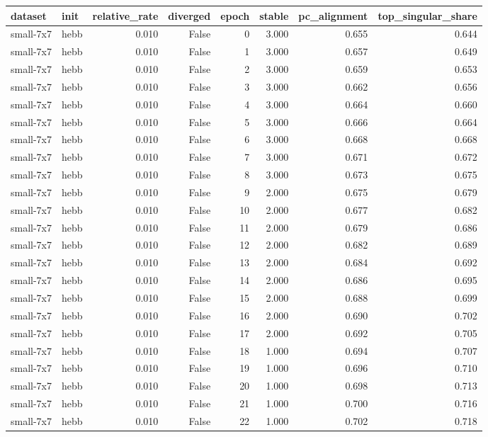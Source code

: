 \begin{tabular}{llrrrrrr}
\toprule
dataset & init & relative\_rate & diverged & epoch & stable & pc\_alignment & top\_singular\_share \\
\midrule
small-7x7 & hebb & 0.010 & False & 0 & 3.000 & 0.655 & 0.644 \\
small-7x7 & hebb & 0.010 & False & 1 & 3.000 & 0.657 & 0.649 \\
small-7x7 & hebb & 0.010 & False & 2 & 3.000 & 0.659 & 0.653 \\
small-7x7 & hebb & 0.010 & False & 3 & 3.000 & 0.662 & 0.656 \\
small-7x7 & hebb & 0.010 & False & 4 & 3.000 & 0.664 & 0.660 \\
small-7x7 & hebb & 0.010 & False & 5 & 3.000 & 0.666 & 0.664 \\
small-7x7 & hebb & 0.010 & False & 6 & 3.000 & 0.668 & 0.668 \\
small-7x7 & hebb & 0.010 & False & 7 & 3.000 & 0.671 & 0.672 \\
small-7x7 & hebb & 0.010 & False & 8 & 3.000 & 0.673 & 0.675 \\
small-7x7 & hebb & 0.010 & False & 9 & 2.000 & 0.675 & 0.679 \\
small-7x7 & hebb & 0.010 & False & 10 & 2.000 & 0.677 & 0.682 \\
small-7x7 & hebb & 0.010 & False & 11 & 2.000 & 0.679 & 0.686 \\
small-7x7 & hebb & 0.010 & False & 12 & 2.000 & 0.682 & 0.689 \\
small-7x7 & hebb & 0.010 & False & 13 & 2.000 & 0.684 & 0.692 \\
small-7x7 & hebb & 0.010 & False & 14 & 2.000 & 0.686 & 0.695 \\
small-7x7 & hebb & 0.010 & False & 15 & 2.000 & 0.688 & 0.699 \\
small-7x7 & hebb & 0.010 & False & 16 & 2.000 & 0.690 & 0.702 \\
small-7x7 & hebb & 0.010 & False & 17 & 2.000 & 0.692 & 0.705 \\
small-7x7 & hebb & 0.010 & False & 18 & 1.000 & 0.694 & 0.707 \\
small-7x7 & hebb & 0.010 & False & 19 & 1.000 & 0.696 & 0.710 \\
small-7x7 & hebb & 0.010 & False & 20 & 1.000 & 0.698 & 0.713 \\
small-7x7 & hebb & 0.010 & False & 21 & 1.000 & 0.700 & 0.716 \\
small-7x7 & hebb & 0.010 & False & 22 & 1.000 & 0.702 & 0.718 \\

\end{tabular}
